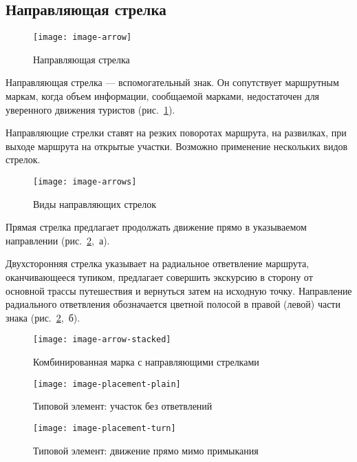 \documentclass[a5paper,10pt,titlepage]{extarticle}
\begin{document}
\subsection{Направляющая стрелка}
\begin{figure}
	\centering
	\texttt{[image: image-arrow]}
	\caption{Направляющая стрелка}\label{fig:arrow}
\end{figure}

Направляющая стрелка --- вспомогательный знак. Он сопутствует маршрутным маркам, когда объем информации, сообщаемой
марками, недостаточен для уверенного движения туристов (рис.~\ref{fig:arrow}).

Направляющие стрелки ставят на резких поворотах маршрута, на развилках, при выходе маршрута на открытые участки.
Возможно применение нескольких видов стрелок.

\begin{figure}
	\centering
	\texttt{[image: image-arrows]}
	\caption{Виды направляющих стрелок}\label{fig:arrows}
\end{figure}

Прямая стрелка предлагает продолжать движение прямо в указываемом направлении (рис.~\ref{fig:arrows},~а).

Двухсторонняя стрелка указывает на радиальное ответвление маршрута, оканчивающееся тупиком, предлагает
совершить экскурсию в сторону от основной трассы путешествия и вернуться затем на исходную точку. Направление
радиального ответвления обозначается цветной полосой в правой (левой) части знака (рис.~\ref{fig:arrows},~б).

\begin{figure}[ht]
	\centering
	\texttt{[image: image-arrow-stacked]}
	\caption{Комбинированная марка с направляющими стрелками}\label{fig:arrow-stacked}
\end{figure}

\begin{figure}[ht]
	\centering
	\texttt{[image: image-placement-plain]}
	\caption{Типовой элемент: участок без ответвлений}\label{fig:placement-plain}
\end{figure}

\begin{figure}[ht]
	\centering
	\texttt{[image: image-placement-turn]}
	\caption{Типовой элемент: движение прямо мимо примыкания}\label{fig:placement-turn}
\end{figure}
\end{document}
